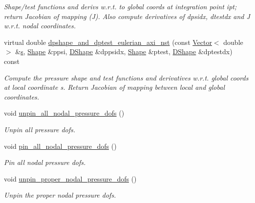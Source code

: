 \begin{DoxyCompactItemize}
\begin{DoxyCompactList}\small\item\em Shape/test functions and derivs w.\+r.\+t. to global coords at integration point ipt; return Jacobian of mapping (J). Also compute derivatives of dpsidx, dtestdx and J w.\+r.\+t. nodal coordinates. \end{DoxyCompactList}\item 
virtual double \hyperlink{classoomph_1_1GeneralisedNewtonianAxisymmetricTTaylorHoodElement_ad34b985b934382ef26968ebea4f54522}{dpshape\+\_\+and\+\_\+dptest\+\_\+eulerian\+\_\+axi\+\_\+nst} (const \hyperlink{classoomph_1_1Vector}{Vector}$<$ double $>$ \&\hyperlink{cfortran_8h_ab7123126e4885ef647dd9c6e3807a21c}{s}, \hyperlink{classoomph_1_1Shape}{Shape} \&ppsi, \hyperlink{classoomph_1_1DShape}{D\+Shape} \&dppsidx, \hyperlink{classoomph_1_1Shape}{Shape} \&ptest, \hyperlink{classoomph_1_1DShape}{D\+Shape} \&dptestdx) const
\begin{DoxyCompactList}\small\item\em Compute the pressure shape and test functions and derivatives w.\+r.\+t. global coords at local coordinate s. Return Jacobian of mapping between local and global coordinates. \end{DoxyCompactList}\item 
void \hyperlink{classoomph_1_1GeneralisedNewtonianAxisymmetricTTaylorHoodElement_a951b5516cd3374730d55a8369d49a4fa}{unpin\+\_\+all\+\_\+nodal\+\_\+pressure\+\_\+dofs} ()
\begin{DoxyCompactList}\small\item\em Unpin all pressure dofs. \end{DoxyCompactList}\item 
void \hyperlink{classoomph_1_1GeneralisedNewtonianAxisymmetricTTaylorHoodElement_ad8861d17694cf61211abff428a80ef97}{pin\+\_\+all\+\_\+nodal\+\_\+pressure\+\_\+dofs} ()
\begin{DoxyCompactList}\small\item\em Pin all nodal pressure dofs. \end{DoxyCompactList}\item 
void \hyperlink{classoomph_1_1GeneralisedNewtonianAxisymmetricTTaylorHoodElement_a74cb6b4598adf749f1011ed88f7a7455}{unpin\+\_\+proper\+\_\+nodal\+\_\+pressure\+\_\+dofs} ()
\begin{DoxyCompactList}\small\item\em Unpin the proper nodal pressure dofs. \end{DoxyCompactList}\end{DoxyCompactItemize}
